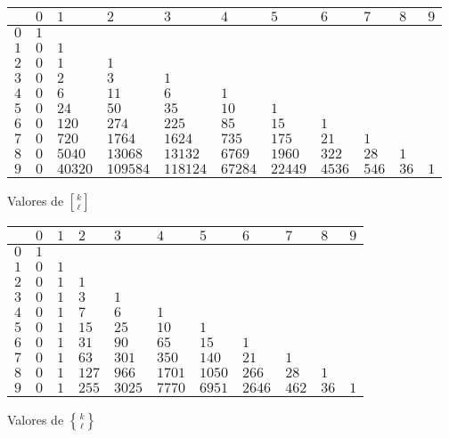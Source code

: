 \documentclass{article}
\DeclareRobustCommand{\Stirling}{\genfrac\{\}{0pt}{}}
\DeclareRobustCommand{\stirling}{\genfrac[]{0pt}{}}
\begin{document}
\pagebreak

\begin{center}
{\small
\noindent\begin{tabular}{|f{0.9cm}|f{0.9cm}|f{0.9cm}|f{0.9cm}|f{0.9cm}|f{0.9cm}|f{0.9cm}|f{0.9cm}|f{0.9cm}|f{0.9cm}|f{0.9cm}|}
\hline
{} & $0$ & $1$ & $2$ & $3$ & $4$ & $5$ & $6$ & $7$ & $8$ & $9$ \tabularnewline\hline
$0$ & $1$ &  &  &  &  &  &  &  &  & \tabularnewline\hline
$1$ & $0$ & $1$ &  &  &  &  &  &  &  & \tabularnewline\hline
$2$ & $0$ & $1$ & $1$ &  &  &  &  &  &  & \tabularnewline\hline
$3$ & $0$ & $2$ & $3$ & $1$ &  &  &  &  &  & \tabularnewline\hline
$4$ & $0$ & $6$ & $11$ & $6$ & $1$ &  &  &  &  & \tabularnewline\hline
$5$ & $0$ & $24$ & $50$ & $35$ & $10$ & $1$ &  &  &  & \tabularnewline\hline
$6$ & $0$ & $120$ & $274$ & $225$ & $85$ & $15$ & $1$ &  &  & \tabularnewline\hline
$7$ & $0$ & $720$ & $1764$ & $1624$ & $735$ & $175$ & $21$ & $1$ &  & \tabularnewline\hline
$8$ & $0$ & $5040$ & $13068$ & $13132$ & $6769$ & $1960$ & $322$ & $28$ & $1$ & \tabularnewline\hline
$9$ & $0$ & $40320$ & $109584$ & $118124$ & $67284$ & $22449$ & $4536$ & $546$ & $36$ & $1$ \tabularnewline\hline
\end{tabular}}

\vspace{1em}

\noindent Valores de $\stirling{k}{\ell}$

\vspace{\fill}

{\small
\noindent\begin{tabular}{|f{0.9cm}|f{0.9cm}|f{0.9cm}|f{0.9cm}|f{0.9cm}|f{0.9cm}|f{0.9cm}|f{0.9cm}|f{0.9cm}|f{0.9cm}|f{0.9cm}|}
\hline
{} & $0$ & $1$ & $2$ & $3$ & $4$ & $5$ & $6$ & $7$ & $8$ & $9$ \tabularnewline\hline
$0$ & $1$ &  &  &  &  &  &  &  &  & \tabularnewline\hline
$1$ & $0$ & $1$ &  &  &  &  &  &  &  & \tabularnewline\hline
$2$ & $0$ & $1$ & $1$ &  &  &  &  &  &  & \tabularnewline\hline
$3$ & $0$ & $1$ & $3$ & $1$ &  &  &  &  &  & \tabularnewline\hline
$4$ & $0$ & $1$ & $7$ & $6$ & $1$ &  &  &  &  & \tabularnewline\hline
$5$ & $0$ & $1$ & $15$ & $25$ & $10$ & $1$ &  &  &  & \tabularnewline\hline
$6$ & $0$ & $1$ & $31$ & $90$ & $65$ & $15$ & $1$ &  &  & \tabularnewline\hline
$7$ & $0$ & $1$ & $63$ & $301$ & $350$ & $140$ & $21$ & $1$ &  & \tabularnewline\hline
$8$ & $0$ & $1$ & $127$ & $966$ & $1701$ & $1050$ & $266$ & $28$ & $1$ & \tabularnewline\hline
$9$ & $0$ & $1$ & $255$ & $3025$ & $7770$ & $6951$ & $2646$ & $462$ & $36$ & $1$ \tabularnewline\hline
\end{tabular}}

\vspace{1em}

\noindent Valores de $\Stirling{k}{\ell}$
\end{center}
\end{document}
